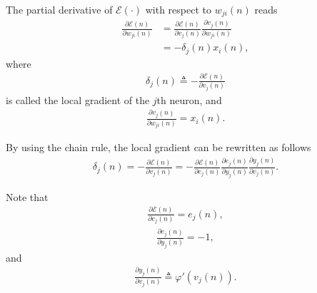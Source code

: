\documentclass[12pt,a4paper]{article}
\begin{document}
The partial derivative of \(\mathscr{E}(\cdot)\) with respect to \(w_{ji}(n)\) reads
\begin{align}
    \frac{\partial \mathscr{E}(n)}{\partial w_{ji}(n)} & = \frac{\partial \mathscr{E}(n)}{\partial v_{j}(n)} \frac{\partial v_j(n)}{\partial w_{ji}(n)} \nonumber \\
    & = - \delta_j (n) x_i(n),
    \label{eq:cost-function}
\end{align}
where
\begin{align}
    \delta_j (n) \triangleq - \frac{\partial \mathscr{E}(n)}{\partial v_{j}(n)}
\end{align}
is called the local gradient of the \(j\)th neuron, and
\begin{align}
    \frac{\partial v_j(n)}{\partial w_{ji}(n)} = x_i(n).
    \label{eq:chain4}
\end{align}

By using the chain rule, the local gradient can be rewritten as follows
\begin{align}
    \delta_j (n) = - \frac{\partial \mathscr{E}(n)}{\partial v_{j}(n)} = - \frac{\partial \mathscr{E}(n)}{\partial e_{j}(n)} \frac{\partial e_j(n)}{\partial y_j(n)} \frac{\partial y_j(n)}{\partial v_{j}(n)}.
    \label{eq:local-gradient}
\end{align}

Note that
\begin{align}
    \frac{\partial \mathscr{E}(n)}{\partial e_{j}(n)} = e_{j}(n),
    \label{eq:chain1}
\end{align}
\begin{align}
    \frac{\partial e_j(n)}{\partial y_j(n)} = -1,
    \label{eq:chain2}
\end{align}
and
\begin{align}
    \frac{\partial y_j(n)}{\partial v_{j}(n)} \triangleq \varphi'(v_{j}(n)).
    \label{eq:chain3}
\end{align}
\end{document}
